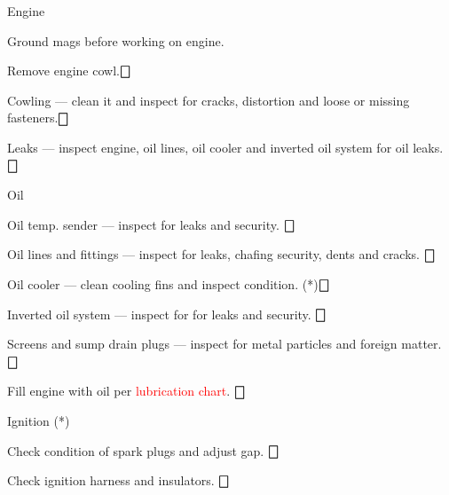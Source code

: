 \begin{enumerate*}
	\item{Engine} 
{\begin{Note}[WARNING] \centering Ground mags before working on engine. \end{Note}}
	\begin{enumerate*}
		\item Remove engine cowl.\dotfill $\bigbox$
		\item Cowling --- clean it and inspect for cracks, distortion and loose or missing fasteners.\dotfill $\bigbox$
		\item Leaks --- inspect engine, oil lines, oil cooler and inverted oil system for oil leaks.\dotfill $\bigbox$
		\item Oil 
		\begin{enumerate*}
			\item Oil temp. sender --- inspect for leaks and security. \dotfill $\bigbox$
			\item Oil lines and fittings --- inspect for leaks, chafing security, dents and cracks. \dotfill $\bigbox$
			\item Oil cooler --- clean cooling fins and inspect condition. (*)\dotfill $\bigbox$
			\item Inverted oil system --- inspect for for leaks and security. \dotfill $\bigbox$
			\item Screens and sump drain plugs --- inspect for metal particles and foreign matter. \dotfill $\bigbox$
			\item Fill engine with oil per \textcolor{red}{lubrication chart}. \dotfill $\bigbox$
		\end{enumerate*}
		\item Ignition (*)
		\begin{enumerate*}
			\item Check condition of spark plugs and adjust gap. \dotfill $\bigbox$
			\item Check ignition harness and insulators. \dotfill $\bigbox$
\end{enumerate*}
\end{enumerate*}
\end{enumerate*}
